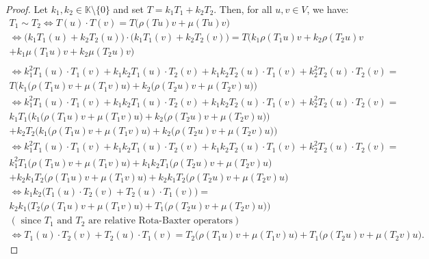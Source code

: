 \documentclass[12pt]{amsart}
\begin{document}
\begin{proof} Let $ k_{1},k_{2}\in \mathbb{K}\setminus\{0\} $ and set $ T=k_{1}T_{1}+k_{2}T_{2} $.
	Then, for all  $ u,v\in V $, we have:\\
	$ \begin{array}{lll}
		T_{1}\sim T_{2}\iff T(u)\cdot T(v)=T\bigg(\rho(Tu)v+\mu(Tu)v\bigg)\\
		\iff \bigg(k_{1}T_{1}(u)+k_{2}T_{2}(u)\bigg)\cdot \bigg(k_{1}T_{1}(v)+k_{2}T_{2}(v)\bigg)=T\bigg(k_{1}\rho(T_{1}u)v+k_{2}\rho(T_{2}u)v\\
		+k_{1}\mu(T_{1}u)v+k_{2}\mu(T_{2}u)v\bigg)\\
			\end{array} $\\
	$ \begin{array}{lll}
		\iff k^{2}_{1}T_{1}(u)\cdot T_{1}(v)+k_{1}k_{2}T_{1}(u)\cdot T_{2}(v)+k_{1}k_{2}T_{2}(u)\cdot T_{1}(v)+k^{2}_{2}T_{2}(u)\cdot T_{2}(v)=\\
		T\bigg(k_{1}\bigg(\rho(T_{1}u)v+\mu(T_{1}v)u\bigg)+k_{2}\bigg(\rho(T_{2}u)v+\mu(T_{2}v)u\bigg) \bigg)\\
		\iff k^{2}_{1}T_{1}(u)\cdot T_{1}(v)+k_{1}k_{2}T_{1}(u)\cdot T_{2}(v)+k_{1}k_{2}T_{2}(u)\cdot T_{1}(v)+k^{2}_{2}T_{2}(u)\cdot T_{2}(v)=\\
		k_{1}T_{1}\bigg(k_{1}\bigg(\rho(T_{1}u)v+\mu(T_{1}v)u\bigg)+k_{2}\bigg(\rho(T_{2}u)v+\mu(T_{2}v)u\bigg) \bigg)\\
		+k_{2}T_{2}\bigg(k_{1}\bigg(\rho(T_{1}u)v+\mu(T_{1}v)u\bigg)+k_{2}\bigg(\rho(T_{2}u)v+\mu(T_{2}v)u\bigg) \bigg)\\
		\iff k^{2}_{1}T_{1}(u)\cdot T_{1}(v)+k_{1}k_{2}T_{1}(u)\cdot T_{2}(v)+k_{1}k_{2}T_{2}(u)\cdot T_{1}(v)+k^{2}_{2}T_{2}(u)\cdot T_{2}(v)=\\
		k_{1}^{2}T_{1}\bigg(\rho(T_{1}u)v+\mu(T_{1}v)u\bigg)
		
		+k_{1}k_{2}T_{1}\bigg(\rho(T_{2}u)v+\mu(T_{2}v)u\bigg)\\
		+k_{2}k_{1}T_{2}\bigg(\rho(T_{1}u)v+\mu(T_{1}v)u\bigg)
		+k_{2}k_{1}T_{2}\bigg(\rho(T_{2}u)v+\mu(T_{2}v)u\bigg)\\
		\iff k_{1}k_{2}\bigg(T_{1}(u)\cdot T_{2}(v)+T_{2}(u)\cdot T_{1}(v)\bigg)=\\
		k_{2}k_{1}\bigg(T_{2}\bigg(\rho(T_{1}u)v+\mu(T_{1}v)u\bigg)+T_{1}\bigg(\rho(T_{2}u)v+\mu(T_{2}v)u\bigg)\bigg)
		 \nonumber\\
		( \text{ since } T_{1} \text{ and }T_{2} \text{ are relative  Rota-Baxter operators} )\\
		\iff T_{1}(u)\cdot T_{2}(v)+T_{2}(u)\cdot T_{1}(v)=
		T_{2}\bigg(\rho(T_{1}u)v+\mu(T_{1}v)u\bigg)+T_{1}\bigg(\rho(T_{2}u)v+\mu(T_{2}v)u\bigg).
	\end{array} $\\
\end{proof}
\end{document}
